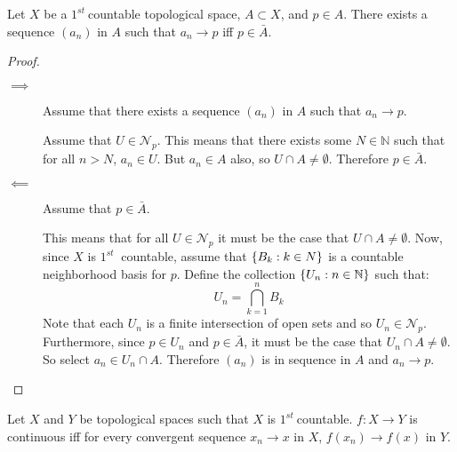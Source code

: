 \documentclass[letterpaper,12pt,fleqn]{article}
\renewcommand{\N}{\mathcal{N}}
\newcommand{\nat}{\mathbb{N}}
\newcommand{\f}{\(1^{st}\ \)}
\begin{document}
\begin{lemma}
  Let \(X\) be a \f countable topological space, \(A\subset X\), and \(p\in A\).  There exists a sequence
  \((a_n)\) in \(A\) such that \(a_n\to p\) iff \(p\in\bar{A}\).
\end{lemma}

\begin{proof}
  \begin{description}
  \item[]
  \item[\(\implies\)] Assume that there exists a sequence \((a_n)\) in \(A\) such that \(a_n\to p\).

    Assume that \(U\in\N_p\).  This means that there exists some \(N\in\nat\) such that for all \(n>N\),
    \(a_n\in U\).  But \(a_n\in A\) also, so \(U\cap A\ne\emptyset\).  Therefore \(p\in\bar{A}\).

  \item[\(\impliedby\)] Assume that \(p\in\bar{A}\).

    This means that for all \(U\in\N_p\) it must be the case that \(U\cap A\ne\emptyset\).  Now, since \(X\) is \f
    countable, assume that \(\{B_k:k\in N\}\) is a countable neighborhood basis for \(p\).  Define the collection
    \(\set{U_n:n\in\nat}\) such that:
    \[U_n=\bigcap_{k=1}^nB_k\]
    Note that each \(U_n\) is a finite intersection of open sets and so \(U_n\in\N_p\).  Furthermore, since
    \(p\in U_n\) and \(p\in\bar{A}\), it must be the case that \(U_n\cap A\ne\emptyset\).  So select
    \(a_n\in U_n\cap A\).  Therefore \((a_n)\) is in sequence in \(A\) and \(a_n\to p\).
  \end{description}
\end{proof}

\begin{theorem}[7.6]
  Let \(X\) and \(Y\) be topological spaces such that \(X\) is \f countable.  \(f:X\to Y\) is continuous iff
  for every convergent sequence \(x_n\to x\) in \(X\), \(f(x_n)\to f(x)\) in \(Y\).
\end{theorem}
\end{document}
